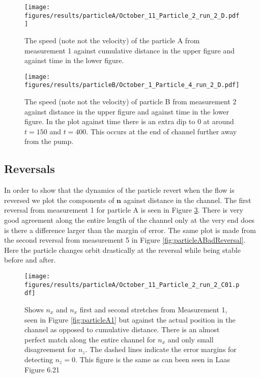 \begin{figure}[H]
\begin{center}
\texttt{[image: figures/results/particleA/October\_11\_Particle\_2\_run\_2\_D.pdf]}
\end{center}
\caption{The speed (note not the velocity) of the particle A from measurement 1 against cumulative distance in the upper figure and against time in the lower figure.}
\label{fig:particleAspeed}
\end{figure}


\begin{figure}[H]
\begin{center}
\texttt{[image: figures/results/particleB/October\_1\_Particle\_4\_run\_2\_D.pdf]}
\end{center}
\caption{The speed (note not the velocity) of particle B from measurement 2 against distance in the upper figure and against time in the lower figure. In the plot against time there is an extra dip to 0 at around $t=150$ and $t=400$. This occurs at the end of channel further away from the pump.}
\label{fig:particleB1speed}
\end{figure}


\subsection{Reversals}
In order to show that the dynamics of the particle revert when the flow is reversed we plot the components of $\mathbf{n}$ against distance in the channel. The first reversal from measurement 1 for particle A is seen in Figure \ref{fig:particleAreversegood}. There is very good agreement along the entire length of the channel only at the very end does is there a difference larger than the margin of error. The same plot is made from the second reversal from measurement 5 in Figure \ref{fig:particleABadReversal}. Here the particle changes orbit drastically at the reversal while being stable before and after. 

\begin{figure}[H]
\begin{center}
\texttt{[image: figures/results/particleA/October\_11\_Particle\_2\_run\_2\_C01.pdf]}
\end{center}
\caption{Shows $n_x$ and $n_x$ first and second stretches from Measurement 1, seen in Figure \ref{fig:particleA1} but against the actual position in the channel as opposed to cumulative distance. There is an almost perfect match along the entire channel for $n_x$ and only small disagreement for $n_z$. The dashed lines indicate the error margins for detecting $n_z=0$. This figure is the same as can been seen in Laas\cite{alexanderThesis} Figure 6.21}
\label{fig:particleAreversegood}
\end{figure}


